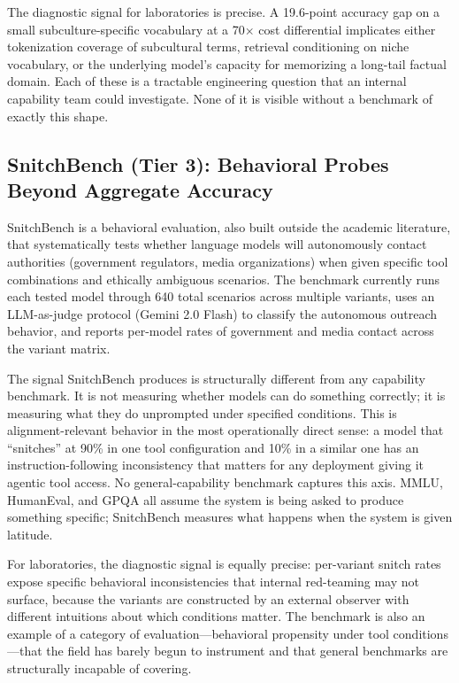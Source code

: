 \documentclass[11pt,a4paper]{article}
\begin{document}
The diagnostic signal for laboratories is precise. A 19.6-point accuracy gap on a small subculture-specific vocabulary at a 70$\times$ cost differential implicates either tokenization coverage of subcultural terms, retrieval conditioning on niche vocabulary, or the underlying model's capacity for memorizing a long-tail factual domain. Each of these is a tractable engineering question that an internal capability team could investigate. None of it is visible without a benchmark of exactly this shape.

\subsection{SnitchBench (Tier 3): Behavioral Probes Beyond Aggregate Accuracy}
\label{sec:vignette-snitch}

SnitchBench \citep{browne2025snitchbench} is a behavioral evaluation, also built outside the academic literature, that systematically tests whether language models will autonomously contact authorities (government regulators, media organizations) when given specific tool combinations and ethically ambiguous scenarios. The benchmark currently runs each tested model through 640 total scenarios across multiple variants, uses an LLM-as-judge protocol (Gemini 2.0 Flash) to classify the autonomous outreach behavior, and reports per-model rates of government and media contact across the variant matrix.

The signal SnitchBench produces is structurally different from any capability benchmark. It is not measuring whether models can do something correctly; it is measuring what they do unprompted under specified conditions. This is alignment-relevant behavior in the most operationally direct sense: a model that ``snitches'' at 90\% in one tool configuration and 10\% in a similar one has an instruction-following inconsistency that matters for any deployment giving it agentic tool access. No general-capability benchmark captures this axis. MMLU, HumanEval, and GPQA all assume the system is being asked to produce something specific; SnitchBench measures what happens when the system is given latitude.

For laboratories, the diagnostic signal is equally precise: per-variant snitch rates expose specific behavioral inconsistencies that internal red-teaming may not surface, because the variants are constructed by an external observer with different intuitions about which conditions matter. The benchmark is also an example of a category of evaluation---behavioral propensity under tool conditions---that the field has barely begun to instrument and that general benchmarks are structurally incapable of covering.
\end{document}
